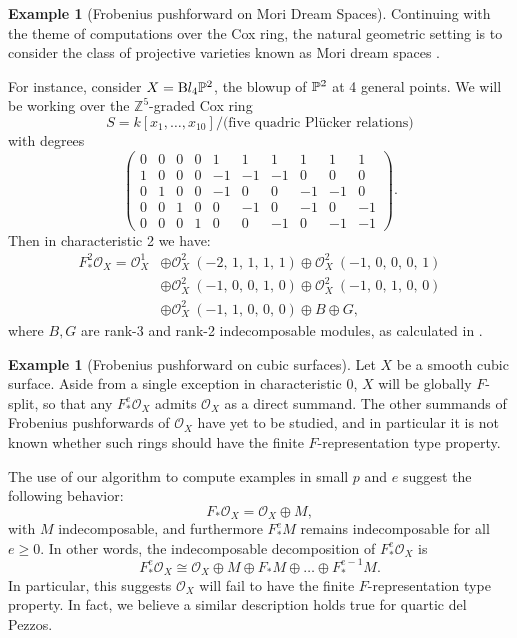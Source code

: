 \documentclass[12pt]{article}
\def\OO{\mathcal O}
\def\ZZ{\mathbb Z}
\def\Bl{\mathrm Bl}
\theoremstyle{theorem}
\numberwithin{thm}{section}
\theoremstyle{definition}
\newtheorem{exa}[thm]{Example}
\begin{document}
\begin{exa}[Frobenius pushforward on Mori Dream Spaces]
  Continuing with the theme of computations over the Cox ring, the natural geometric setting is to consider the class of projective varieties known as Mori dream spaces \cite{HK00}.

  For instance, consider $X = \Bl_4\P^2$, the blowup of $\P^2$ at 4 general points. We will be working over the $\ZZ^5$-graded Cox ring
  \[ S = k[x_1,\dots,x_{10}]/\text{(five quadric Pl\"ucker relations)} \]
  with degrees
    \[
    \left(\!\begin{array}{rrrrrrrrrr}
      0&0&0&0&1&1&1&1&1&1 \\
      1&0&0&0&-1&-1&-1&0&0&0 \\
      0&1&0&0&-1&0&0&-1&-1&0 \\
      0&0&1&0&0&-1&0&-1&0&-1 \\
      0&0&0&1&0&0&-1&0&-1&-1
    \end{array}\!\right).
    \]
    Then in characteristic 2 we have:
    \begin{align*}
      F_*^2\OO_X = {\OO_{X}^{1}}
      &\oplus {\OO_{X}^{2}\ \left(-2,\,1,\,1,\,1,\,1\right)} \oplus {\OO_{X}^{2}\ \left(-1,\,0,\,0,\,0,\,1\right)} \\
      &\oplus {\OO_{X}^{2}\ \left(-1,\,0,\,0,\,1,\,0\right)} \oplus {\OO_{X}^{2}\ \left(-1,\,0,\,1,\,0,\,0\right)} \\
      &\oplus {\OO_{X}^{2}\ \left(-1,\,1,\,0,\,0,\,0\right)} \oplus B \oplus G,
    \end{align*}
    where $B, G$ are rank-3 and rank-2 indecomposable modules, as calculated in \cite{Hara15}.
\end{exa}

\begin{exa}[Frobenius pushforward on cubic surfaces]
  Let $X$ be a smooth cubic surface. Aside from a single exception in characteristic 0, $X$ will be globally $F$-split, so that any $F^e_*\OO_X $ admits $\OO_X$ as a direct summand.
  The other summands of Frobenius pushforwards of $\OO_X$ have yet to be studied, and in particular it is not known whether such rings should have the finite $F$-representation type property.

  The use of our algorithm to compute examples in small $p$ and $e$ suggest the following behavior:
  $$ F_* \OO_X = \OO_X\oplus M, $$
  with $M$ indecomposable, and furthermore $F_*^e M$ remains indecomposable for all $e\geq 0$. In other words, the indecomposable decomposition of $F^e_* \OO_X$ is
  $$ F_*^e \OO_X \cong \OO_X\oplus M\oplus F_* M\oplus\dots\oplus F_*^{e-1}M. $$
  In particular, this suggests $\OO_X$ will fail to have the finite $F$-representation type property.
  In fact, we believe a similar description holds true for quartic del Pezzos.
\end{exa}
\end{document}
